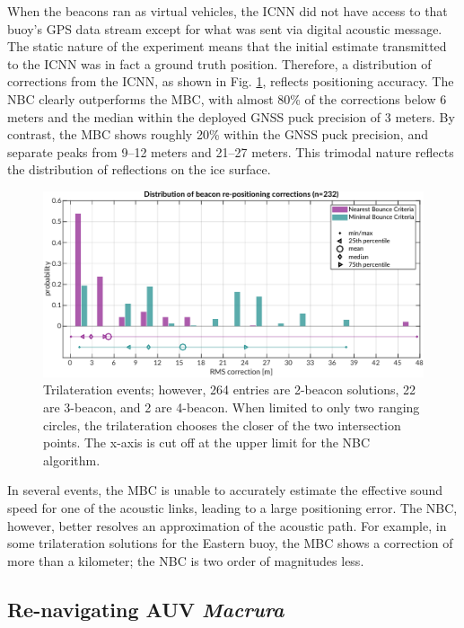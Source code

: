 When the beacons ran as virtual vehicles, the ICNN did not have access to that buoy's GPS data stream except for what was sent via digital acoustic message.
The static nature of the experiment means that the initial estimate transmitted to the ICNN was in fact a ground truth position.
Therefore, a distribution of corrections from the ICNN, as shown in Fig. \ref{fig:trilat-beacon}, reflects positioning accuracy.
The NBC clearly outperforms the MBC, with almost 80\% of the corrections below 6 meters and the median within the deployed GNSS puck precision of 3 meters.
By contrast, the MBC shows roughly 20\% within the GNSS puck precision, and separate peaks from 9--12 meters and 21--27 meters.
This trimodal nature reflects the distribution of reflections on the ice surface.

\begin{figure}[!ht]
\includegraphics[width=\textwidth]{figs/beacon-trilat-stat.pdf}
\caption{Trilateration events; however, 264 entries are 2-beacon solutions, 22 are 3-beacon, and 2 are 4-beacon. When limited to only two ranging circles, the trilateration chooses the closer of the two intersection points. The x-axis is cut off at the upper limit for the NBC algorithm.}
\label{fig:trilat-beacon}
\end{figure}

In several events, the MBC is unable to accurately estimate the effective sound speed for one of the acoustic links, leading to a large positioning error.
The NBC, however, better resolves an approximation of the acoustic path.
For example, in some trilateration solutions for the Eastern buoy, the MBC shows a correction of more than a kilometer; the NBC is two order of magnitudes less.

\subsection{Re-navigating AUV \emph{Macrura}}

